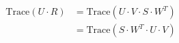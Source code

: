 \documentclass[paper=a5,fontsize=16pt]{scrbook}
\begin{document}
            \begin{preview}

            
            \begin{align*}
            \text{Trace}(U \cdot R) &= \text{Trace}(U \cdot V \cdot S \cdot W^T) \\
                                    &= \text{Trace}(S \cdot W^T \cdot U \cdot V)
            \end{align*}        
        


            \end{preview}
            
\end{document}
